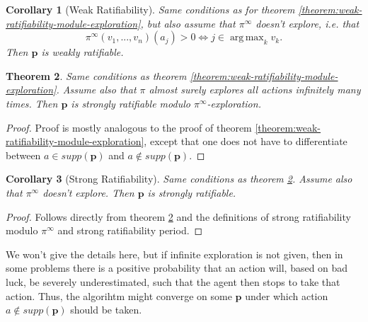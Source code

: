 \documentclass{article}
\DeclareMathOperator*{\argmax}{arg\,max}
\newtheorem{thm}{Theorem} %
\newtheorem{corollary}[thm]{Corollary}
\begin{document}
\begin{corollary}[Weak Ratifiability]
Same conditions as for theorem \ref{theorem:weak-ratifiability-module-exploration}, but also assume that $\pi^\infty$ doesn't explore, i.e. that
\begin{equation}
\pi^\infty(v_1,...,v_n)(a_j) >0 \iff j\in \argmax_k v_k.
\end{equation}
Then $\mathbf{p}$ is weakly ratifiable.
\end{corollary}

\begin{thm}\label{theorem:strong-ratifiability-module-exploration}
Same conditions as theorem \ref{theorem:weak-ratifiability-module-exploration}. Assume also that $\pi$ almost surely explores all actions infinitely many times. Then $\mathbf{p}$ is strongly ratifiable modulo $\pi^\infty$-exploration. 
\end{thm}
\begin{proof}
Proof is mostly analogous to the proof of theorem \ref{theorem:weak-ratifiability-module-exploration}, except that one does not have to differentiate between $a\in supp(\mathbf{p})$ and $a\notin supp(\mathbf{p})$.
\end{proof}

\begin{corollary}[Strong Ratifiability]
Same conditions as theorem \ref{theorem:strong-ratifiability-module-exploration}. Assume also that $\pi^\infty$ doesn't explore. Then $\mathbf{p}$ is strongly ratifiable.
\end{corollary}
\begin{proof}
Follows directly from theorem \ref{theorem:strong-ratifiability-module-exploration} and the definitions of strong ratifiability modulo $\pi^\infty$ and strong ratifiability period.
\end{proof}

We won't give the details here, but if infinite exploration is not given, then in some problems there is a positive probability that an action will, based on bad luck, be severely underestimated, such that the agent then stops to take that action. Thus, the algorihtm might converge on some $\mathbf{p}$ under which action $a\notin supp(\mathbf{p})$ should be taken.
\end{document}
